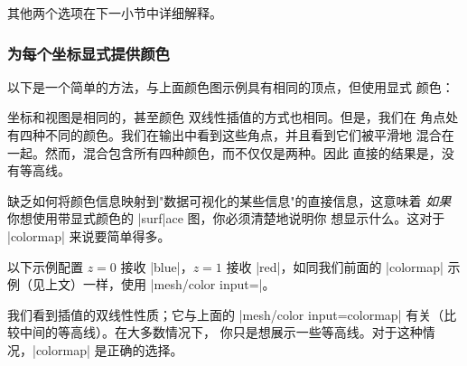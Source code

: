 {{其他两个选项在下一小节中详细解释。


\subsubsection{为每个坐标显式提供颜色}
\label{sec:surf:explicit:color}

以下是一个简单的方法，与上面颜色图示例具有相同的顶点，但使用显式
颜色：
%
\begin{codeexample}[]
\end{codeexample}
%
\noindent 坐标和视图是相同的，甚至颜色
双线性插值的方式也相同。但是，我们在
角点处有四种不同的颜色。我们在输出中看到这些角点，并且看到它们被平滑地
混合在一起。然而，混合包含所有四种颜色，而不仅仅是两种。因此
直接的结果是，没有等高线。

缺乏如何将颜色信息映射到"数据可视化的某些信息"的直接信息，这意味着
\emph{如果}你想使用带显式颜色的 |surf|ace 图，你必须清楚地说明你
想显示什么。这对于 |colormap| 来说要简单得多。

以下示例配置 $z=0$ 接收 |blue|，$z=1$ 接收
|red|，如同我们前面的 |colormap| 示例（见上文）一样，使用
|mesh/color input=|。
%
\begin{codeexample}[]
\end{codeexample}
%
\noindent 我们看到插值的双线性性质；它与上面的
|mesh/color input=colormap| 有关（比较中间的等高线）。在大多数情况下，
你只是想展示一些等高线。对于这种情况，|colormap| 是正确的选择。

}}
